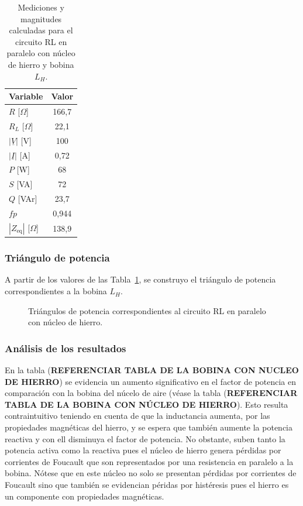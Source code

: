 \begin{table}[H]
    \centering
    \caption{Mediciones y magnitudes calculadas para el circuito RL en paralelo con núcleo de hierro y bobina $L_H$.}
    \label{tab:tp3_hierro_l2}
    \begin{tabular}{lc}
        \toprule
        Variable & Valor \\
        \midrule
        $R$ [$\Omega$] & 166,7 \\
        $R_L$ [$\Omega$] & 22,1 \\
        $|\underline{V}|$ [V] & 100 \\
        $|\underline{I}|$ [A] & 0,72 \\
        $P$ [W] & 68 \\
        $S$ [VA] & 72 \\
        $Q$ [VAr] & 23,7 \\
        $fp$ & 0,944 \\
        $|Z_{\text{eq}}|$ [$\Omega$] & 138,9 \\
        \bottomrule
    \end{tabular}
\end{table}

\subsubsection{Triángulo de potencia}

A partir de los valores de las Tabla~\ref{tab:tp3_hierro_l2}, se construyo el triángulo de potencia correspondientes a la bobina $L_H$.

\begin{figure}[H]
    \centering
    \begin{minipage}{0.38\textwidth}
        \centering
    \end{minipage}
    \caption{Triángulos de potencia correspondientes al circuito RL en paralelo con núcleo de hierro.}
    \label{fig:triangulos_hierro}
\end{figure}

\subsubsection{Análisis de los resultados}
En la tabla (\textbf{REFERENCIAR TABLA DE LA BOBINA CON NUCLEO DE HIERRO}) se evidencia un aumento significativo en el factor de potencia en comparación con la bobina del núcelo de aire (véase la tabla (\textbf{REFERENCIAR TABLA DE LA BOBINA CON NÚCLEO DE HIERRO}). Esto resulta contraintuitivo teniendo en cuenta de que la inductancia aumenta, por las propiedades magnéticas del hierro, y se espera que también aumente la potencia reactiva y con ell disminuya el factor de potencia. No obstante, suben tanto la potencia activa como la reactiva pues el núcleo de hierro genera pérdidas por corrientes de Foucault que son representados por una resistencia en paralelo a la bobina. Nótese que en este núcleo no solo se presentan pérdidas por corrientes de Foucault sino que también se evidencian péridas por histéresis pues el hierro es un componente con propiedades magnéticas.

